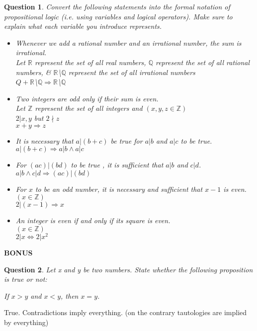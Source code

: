 \documentclass[11pt,oneside]{article}
\newtheorem{question}{Question}
\begin{document}
\begin{question}
    Convert the following statements into the formal notation of propositional logic (i.e. using variables and logical operators). Make sure to explain what each variable you introduce represents.

    \begin{itemize}
      \item Whenever we add a rational number and an irrational number, the sum is irrational. \\
          \emph{Let $\mathbb{R}$ represent the set of all real numbers, $\mathbb{Q}$ represent the set of all rational numbers, \& $\mathbb{R}$\textbackslash $\mathbb{Q}$ represent the set of all irrational numbers} \\
          $Q + \mathbb{R}$\textbackslash $\mathbb{Q} \Rightarrow \mathbb{R}$\textbackslash $\mathbb{Q}$

      \item Two integers are odd only if their sum is even. \\
          \emph{Let $\mathbb{Z}$ represent the set of all integers and $(x,y,z \in \mathbb{Z})$} \\
          \emph{$2|x,y$ but $2 \nmid z$} \\
          $x + y \Rightarrow z$

      \item It is necessary that $a|(b+c)$ be true for $a|b$ and $a|c$ to be true. \\
          $a|(b + c) \Rightarrow a|b \wedge a|c$

      \item For $(ac)|(bd)$ to be true , it is sufficient that $a|b$ and $c|d$. \\
          $a|b \wedge c|d \Rightarrow (ac)|(bd)$

      \item For $x$ to be an odd number, it is necessary and sufficient that $x-1$ is even. \\
          $(x \in \mathbb{Z})$ \\
          $2|(x - 1) \Rightarrow x$

      \item An integer is even if and only if its square is even. \\
          $(x \in \mathbb{Z})$ \\
          $ 2|x \Leftrightarrow 2|x^2$

    \end{itemize}
\end{question}

\centerline{\bf BONUS}
\begin{question}
    Let x and y be two numbers. State whether the following proposition is true or not: \\
        \centerline{If $x > y$ and $x < y$, then $x = y$.}
\end{question}

True. Contradictions imply everything. (on the contrary tautologies are implied by everything)
\end{document}

